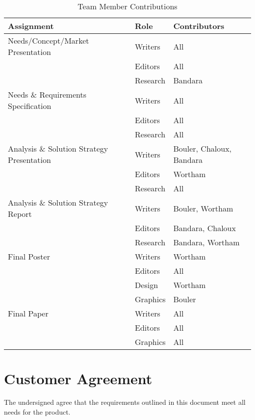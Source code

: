 \documentclass[12pt,letterpaper]{article}
\begin{document}
\begin{table}[h!]
\begin{center}
\begin{tabular}{|l|l|l|}
\hline
\textbf{Assignment} & \textbf{Role} & \textbf{Contributors} \\
\hline

Needs/Concept/Market Presentation & Writers & All \\
\cline{2-3}
& Editors  & All \\
\cline{2-3}
& Research  & Bandara \\
\hline

Needs \& Requirements Specification & Writers & All \\
\cline{2-3}
& Editors  & All \\
\cline{2-3}
& Research  & All \\
\hline

Analysis \& Solution Strategy Presentation & Writers & Bouler, Chaloux, Bandara \\
\cline{2-3}
& Editors  & Wortham \\
\cline{2-3}
& Research  & All \\
\hline

Analysis \& Solution Strategy Report & Writers & Bouler, Wortham \\
\cline{2-3}
& Editors  & Bandara, Chaloux \\
\cline{2-3}
& Research  & Bandara, Wortham \\
\hline

Final Poster & Writers & Wortham \\
\cline{2-3}
& Editors  & All \\
\cline{2-3}
& Design	& Wortham \\
\cline{2-3}
& Graphics	& Bouler \\
\hline

Final Paper & Writers & All \\
\cline{2-3}
& Editors  & All \\
\cline{2-3}
& Graphics	& All \\
\hline
\end{tabular}
\caption{Team Member Contributions}
\end{center}
\end{table}

\clearpage
\section{Customer Agreement}


The undersigned agree that the requirements outlined in this document meet all needs for the product.


\end{document}
